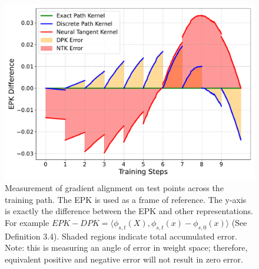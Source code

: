 \begin{figure}[!ht]
        \centering
        \includegraphics[width=1.01\linewidth]{c4_figures/estimation_comparison.pdf}

        \caption{Measurement of gradient alignment on test points across the training path. The EPK is used as a frame of reference. The y-axis is exactly the difference between the EPK and other representations. For example $EPK-DPK = \langle \phi_{s,t}(X), \phi_{s,t}(x) - \phi_{s,0}(x) \rangle$ (See Definition 3.4). Shaded regions indicate total accumulated error. Note: this is measuring an angle of error in weight space; therefore, equivalent positive and negative error will not result in zero error.}
        \label{fig:error}
\end{figure}

